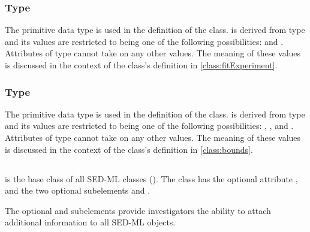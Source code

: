 \begin{blockChanged}
\subsubsection[\element{ExperimentType}]{Type }
\label{type:experimentType}

The  primitive data type is used in the definition of the \FitExperiment class.   is derived from type  and its values are restricted to being one of the following possibilities:  and .  Attributes of type  cannot take on any other values.  The meaning of these values is discussed in the context of the \FitExperiment class's definition in \ref{class:fitExperiment}.


\subsubsection[\element{ScaleType}]{Type }
\label{type:scaleType}

The  primitive data type is used in the definition of the \Bounds class.   is derived from type  and its values are restricted to being one of the following possibilities: , , and .  Attributes of type  cannot take on any other values.  The meaning of these values is discussed in the context of the \Bounds class's definition in \ref{class:bounds}.


\end{blockChanged}


\subsection{}
\label{class:sedBase}
 is the base class of all SED-ML classes (). The  class has the optional attribute \hyperref[sec:metaid]{}, and the two optional subelements \hyperref[sec:notesElement]{} and \hyperref[sec:annotationElement]{}. 

The optional \hyperref[sec:notesElement]{} and \hyperref[sec:annotationElement]{} subelements provide investigators the ability to attach additional information to all SED-ML objects.


